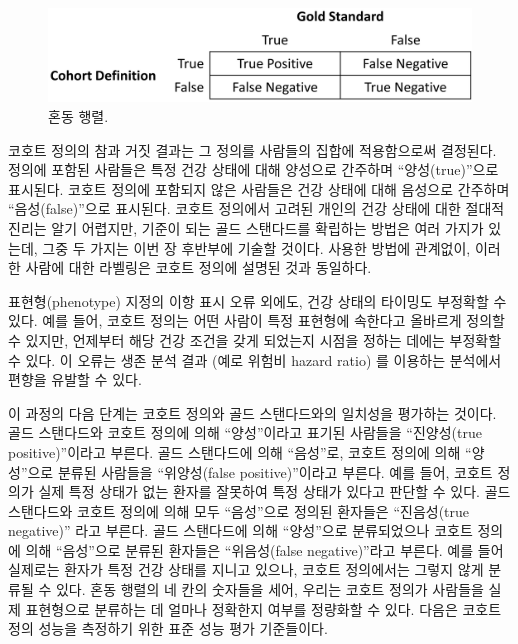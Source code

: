 \documentclass[11pt]{book}
\theoremstyle{definition}
\theoremstyle{definition}
\theoremstyle{definition}
\theoremstyle{remark}
\begin{document}
\begin{figure}

{\centering \includegraphics[width=0.75\linewidth]{images/ClinicalValidity/matrix} 

}

\caption{혼동 행렬.}\label{fig:matrix}
\end{figure}

코호트 정의의 참과 거짓 결과는 그 정의를 사람들의 집합에 적용함으로써
결정된다. 정의에 포함된 사람들은 특정 건강 상태에 대해 양성으로 간주하며
``양성(true)''으로 표시된다. 코호트 정의에 포함되지 않은 사람들은 건강
상태에 대해 음성으로 간주하며 ``음성(false)''으로 표시된다. 코호트
정의에서 고려된 개인의 건강 상태에 대한 절대적 진리는 알기 어렵지만,
기준이 되는 골드 스탠다드를 확립하는 방법은 여러 가지가 있는데, 그중 두
가지는 이번 장 후반부에 기술할 것이다. 사용한 방법에 관계없이, 이러한
사람에 대한 라벨링은 코호트 정의에 설명된 것과 동일하다.

표현형(phenotype) 지정의 이항 표시 오류 외에도, 건강 상태의 타이밍도
부정확할 수 있다. 예를 들어, 코호트 정의는 어떤 사람이 특정 표현형에
속한다고 올바르게 정의할 수 있지만, 언제부터 해당 건강 조건을 갖게
되었는지 시점을 정하는 데에는 부정확할 수 있다. 이 오류는 생존 분석 결과
(예로 위험비 hazard ratio) 를 이용하는 분석에서 편향을 유발할 수 있다.

이 과정의 다음 단계는 코호트 정의와 골드 스탠다드와의 일치성을 평가하는
것이다. 골드 스탠다드와 코호트 정의에 의해 ``양성''이라고 표기된
사람들을 ``진양성(true positive)''이라고 부른다. 골드 스탠다드에 의해
``음성''로, 코호트 정의에 의해 ``양성''으로 분류된 사람들을
``위양성(false positive)''이라고 부른다. 예를 들어, 코호트 정의가 실제
특정 상태가 없는 환자를 잘못하여 특정 상태가 있다고 판단할 수 있다. 골드
스탠다드와 코호트 정의에 의해 모두 ``음성''으로 정의된 환자들은
``진음성(true negative)'' 라고 부른다. 골드 스탠다드에 의해 ``양성''으로
분류되었으나 코호트 정의에 의해 ``음성''으로 분류된 환자들은
``위음성(false negative)''라고 부른다. 예를 들어 실제로는 환자가 특정
건강 상태를 지니고 있으나, 코호트 정의에서는 그렇지 않게 분류될 수 있다.
혼동 행렬의 네 칸의 숫자들을 세어, 우리는 코호트 정의가 사람들을 실제
표현형으로 분류하는 데 얼마나 정확한지 여부를 정량화할 수 있다. 다음은
코호트 정의 성능을 측정하기 위한 표준 성능 평가 기준들이다.
\end{document}
